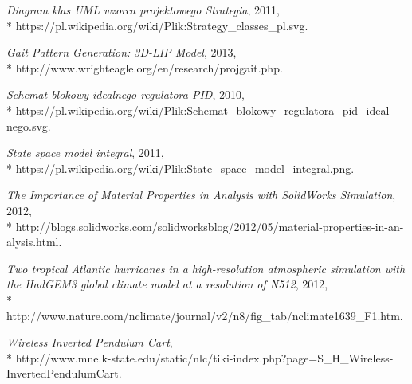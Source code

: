 \documentclass[12pt, twoside, openany]{report}
\theoremstyle{definition}
\begin{document}
\begin{thebibliography}{11}
\emph{Diagram klas UML wzorca projektowego Strategia},
2011,
\\*
https://pl.wikipedia.org/wiki/Plik:Strategy\_classes\_pl.svg.

\emph{Gait Pattern Generation: 3D-LIP Model},
2013,
\\*
http://www.wrighteagle.org/en/research/projgait.php.

\emph{Schemat blokowy idealnego regulatora PID}, 
2010,
\\*
https://pl.wikipedia.org/wiki/Plik:Schemat\_blokowy\_regulatora\_pid\_ideal-\\nego.svg.

 \emph{State space model integral}, 2011,
\\*
https://pl.wikipedia.org/wiki/Plik:State\_space\_model\_integral.png.

\emph{The Importance of Material Properties in Analysis with SolidWorks Simulation}, 
2012,
\\*
http://blogs.solidworks.com/solidworksblog/2012/05/material-properties-in-an-\\alysis.html.

\emph{Two tropical Atlantic hurricanes in a high-resolution atmospheric simulation with the HadGEM3 global climate model at a resolution of N512}, 
2012,
\\*
http://www.nature.com/nclimate/journal/v2/n8/fig\_tab/nclimate1639\_F1.htm.

 \emph{Wireless Inverted Pendulum Cart},
\\*
http://www.mne.k-state.edu/static/nlc/tiki-index.php?page=S\_H\_Wireless-\\InvertedPendulumCart.

\end{thebibliography}
\end{document}
